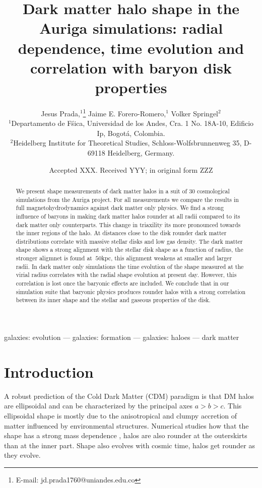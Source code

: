 \documentclass[a4paper,fleqn,usenatbib]{mnras}
\title[The shape of dark matter haloes in the Auriga simulations]
{Dark matter halo shape in the Auriga simulations: radial
  dependence, time evolution and correlation with baryon disk
  properties}
\author[Jesus Prada,  Jaime E. Forero-Romero, Volker Springel ]{
Jesus Prada,$^{1}$\thanks{E-mail: jd.prada1760@uniandes.edu.co}
Jaime E. Forero-Romero,$^{1}$
Volker Springel$^{2}$
\\
$^{1}$Departamento de F\'sica, Universidad de los Andes, Cra. 1 No.
18A-10, Edificio Ip, Bogot\'a, Colombia.\\
$^{2}$Heidelberg Institute for Theoretical Studies,
Schloss-Wolfsbrunnenweg 35, D-69118 Heidelberg, Germany.\\
}
\date{Accepted XXX. Received YYY; in original form ZZZ}
\begin{document}
\label{firstpage}
\pagerange{\pageref{firstpage}--\pageref{lastpage}}
\maketitle

\begin{abstract}
We present shape measurements of dark matter halos in a suit
of 30 cosmological simulations from the Auriga project.
For all measurements we compare the results in full
magnetohydrodynamics against dark matter only physics.
We find a strong influence of baryons in making dark matter halos rounder at all
radii compared to its dark matter only counterparts.
This change in triaxility its more pronounced towards the inner
regions of the halo.
At distances close to the disk rounder dark matter distributions
correlate with massive stellar disks and low gas density.
The dark matter shape shows a strong alignment with the
stellar disk shape as a function of radius, the stronger aligmnet is
found at $~50$kpc, this alignment weakens at smaller and larger radii. 
In dark matter only simulations the time evolution of the shape
measured at the virial radius correlates with the radial shape
evolution at present day.  
However, this correlation is lost once the baryonic effects are
included. 
We conclude that in our simulation suite that baryonic physics
produces rounder halos with a strong correlation between its inner
shape and the stellar and gaseous properties of the disk.
\end{abstract}

\begin{keywords}
galaxies: evolution --- galaxies: formation --- galaxies: haloes ---
dark matter
\end{keywords}



\section{Introduction}


A robust prediction of the Cold Dark Matter (CDM) paradigm is that DM
halos are ellipsoidal and can be characterized by the principal axes
$a>b>c$.
This ellipsoidal shape is mostly due to the anisotropical and
clumpy accretion of matter influenced by environmental structures.
Numerical studies how that the shape has a strong mass dependence
\citep{Allgood_et_al._2006}, halos are also rounder at the outerskirts
than at the inner part. 
Shape also evolves with cosmic time, halos get
rounder as they evolve.  
\end{document}
